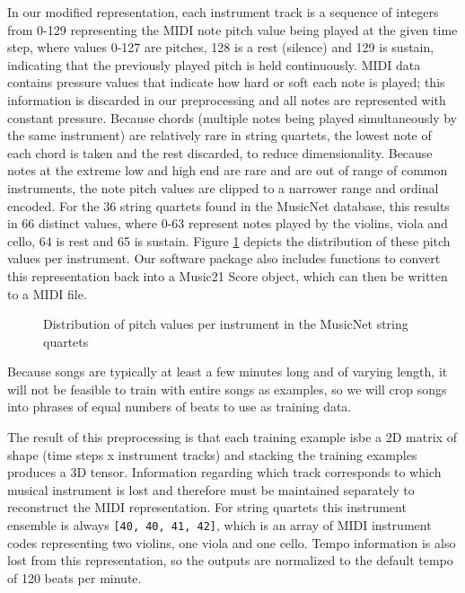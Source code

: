 \documentclass[sigconf,authorversion]{acmart}
\begin{document}
In our modified representation, each instrument track is a sequence of
integers from 0-129 representing the MIDI note pitch value being
played at the given time step, where values 0-127 are pitches, 128 is
a rest (silence) and 129 is sustain, indicating that the previously
played pitch is held continuously. MIDI data contains pressure values
that indicate how hard or soft each note is played; this information
is discarded in our preprocessing and all notes are represented with
constant pressure. Because chords (multiple notes being played
simultaneously by the same instrument) are relatively rare in string
quartets, the lowest note of each chord is taken and the rest
discarded, to reduce dimensionality. Because notes at the extreme low
and high end are rare and are out of range of common instruments, the
note pitch values are clipped to a narrower range and ordinal
encoded. For the 36 string quartets found in the MusicNet database,
this results in 66 distinct values, where 0-63 represent notes played
by the violins, viola and cello, 64 is rest and 65 is sustain. Figure
\ref{pitch_dist} depicts the distribution of these pitch values per
instrument. Our software package also includes functions to convert
this representation back into a Music21 Score object, which can then
be written to a MIDI file.

\begin{figure}[htbp]
    \begin{center}
        \scalebox{0.6}{}
    \end{center}
    \caption{Distribution of pitch values per instrument in the MusicNet string quartets}
    \label{pitch_dist}
\end{figure}

Because songs are typically at least a few minutes long and of varying
length, it will not be feasible to train with entire songs as
examples, so we will crop songs into phrases of equal numbers of
beats to use as training data.

The result of this preprocessing is that each training example isbe a
2D matrix of shape (time steps x instrument tracks) and stacking the
training examples produces a 3D tensor. Information regarding which
track corresponds to which musical instrument is lost and therefore
must be maintained separately to reconstruct the MIDI
representation. For string quartets this instrument ensemble is always
\texttt{[40, 40, 41, 42]}, which is an array of MIDI instrument codes
representing two violins, one viola and one cello. Tempo information
is also lost from this representation, so the outputs are normalized
to the default tempo of 120 beats per minute.
\end{document}
